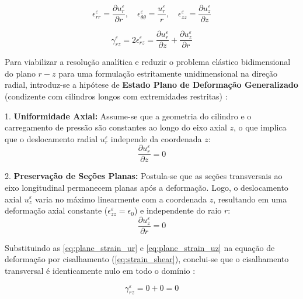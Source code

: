 
\begin{equation}
  \epsilon_{rr}^\varepsilon = \frac{\partial u_r^\varepsilon}{\partial r}, \quad \epsilon_{\theta\theta}^\varepsilon = \frac{u_r^\varepsilon}{r}, \quad \epsilon_{zz}^\varepsilon = \frac{\partial u_z^\varepsilon}{\partial z}
  \label{eq:strains_normal}
\end{equation}

\begin{equation}
  \gamma_{rz}^\varepsilon = 2\epsilon_{rz}^\varepsilon = \frac{\partial u_r^\varepsilon}{\partial z} + \frac{\partial u_z^\varepsilon}{\partial r}
  \label{eq:strain_shear}
\end{equation}

Para viabilizar a resolução analítica e reduzir o problema elástico bidimensional do plano $r-z$ para uma formulação estritamente unidimensional na direção radial, introduz-se a hipótese de \textbf{Estado Plano de Deformação Generalizado} (condizente com cilindros longos com extremidades restritas) \cite{Timoshenko_1951}:

1. \textbf{Uniformidade Axial:} Assume-se que a geometria do cilindro e o carregamento de pressão são constantes ao longo do eixo axial $z$, o que implica que o deslocamento radial $u_r^\varepsilon$ independe da coordenada $z$:
\begin{equation}
  \frac{\partial u_r^\varepsilon}{\partial z} = 0
  \label{eq:plane_strain_ur}
\end{equation}

2. \textbf{Preservação de Seções Planas:} Postula-se que as seções transversais ao eixo longitudinal permanecem planas após a deformação. Logo, o deslocamento axial $u_z^\varepsilon$ varia no máximo linearmente com a coordenada $z$, resultando em uma deformação axial constante ($\epsilon_{zz}^\varepsilon = \epsilon_0$) e independente do raio $r$:
\begin{equation}
  \frac{\partial u_z^\varepsilon}{\partial r} = 0
  \label{eq:plane_strain_uz}
\end{equation}

Substituindo as \eqref{eq:plane_strain_ur} e \eqref{eq:plane_strain_uz} na equação de deformação por cisalhamento (\eqref{eq:strain_shear}), conclui-se que o cisalhamento transversal é identicamente nulo em todo o domínio \cite{Timoshenko_1951}:

\begin{equation}
  \gamma_{rz}^\varepsilon = 0 + 0 = 0
  \label{eq:shear_zero}
\end{equation}

